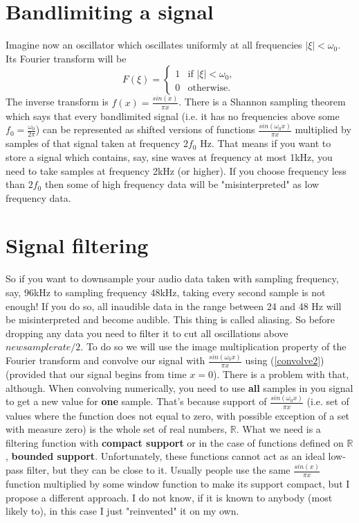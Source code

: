 \documentclass[a4paper,11pt,fleqn]{article}
\let\oldref\ref
\renewcommand{\ref}[1]{(\oldref{#1})}
\begin{document}
\section{Bandlimiting a signal}
Imagine now an oscillator which oscillates uniformly at all frequencies $\left|\xi\right| < \omega_{0}$. 
Its Fourier transform will be
\begin{equation}
\label{idealfilter}
F(\xi) = \left\{
\begin{array}{rl}
1 & \text{if } \left|\xi\right| < \omega_{0},\\
0 & \text{otherwise}.
\end{array} \right.
\end{equation}
The inverse transform is $f(x) = \frac{sin(x)}{\pi x}$. There is a Shannon sampling theorem which says that every
bandlimited signal (i.e. it has no frequencies above some $f_{0}=\frac{\omega_{0}}{2\pi}$) can be represented as 
shifted versions of functions $\frac{sin(\omega_{0}x)}{\pi x}$ multiplied by samples of that signal taken at frequency
$2f_{0}$ Hz. That means if you want to store a signal which contains, say, sine waves at frequency
at most 1kHz, you need to take samples at frequency 2kHz (or higher). If you choose frequency less than $2f_{0}$ then
some of high frequency data will be "misinterpreted" as low frequency data.
\section{Signal filtering}
So if you want to downsample your audio data taken with sampling frequency, say, 96kHz to sampling frequency 48kHz, taking
every second sample is not enough! If you do so, all inaudible data in the range between 24 and 48 Hz will be misinterpreted
and become audible. This thing is called aliasing. So before dropping any data you need to filter it to cut all oscillations
above $newsamplerate / 2$. To do so we will use the image multiplication property of the Fourier transform and convolve
our signal with $\frac{sin(\omega_{0}x)}{\pi x}$ using \ref{convolve2} (provided that our signal begins from time $x=0$). There is
a problem with that, although. When convolving numerically, you need to use \textbf{all} samples in you signal to get a new value
for \textbf{one} sample. That's because support of $\frac{sin(\omega_{0}x)}{\pi x}$ (i.e. set of values where the function does
not equal to zero, with possible exception of a set with measure zero) is the whole set of real numbers, $\mathbb{R}$. What we
need is a filtering function with \textbf{compact support} or in the case of functions defined on $\mathbb{R}$, \textbf{bounded
  support}. Unfortunately, these functions cannot act as an ideal low-pass filter, but they can be close to it. Usually people use
the same $\frac{sin(x)}{\pi x}$ function multiplied by some window function to make its support compact, but I propose a different
approach. I do not know, if it is known to anybody (most likely to), in this case I just "reinvented" it on my own.
\end{document}

